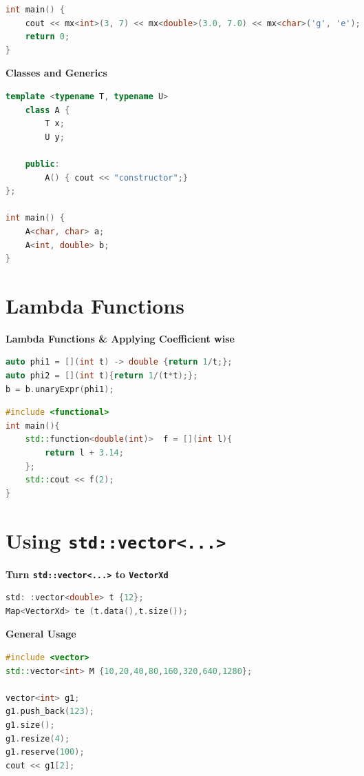 \documentclass{sciposter}
\newcommand{\psection}[1]{\par \textbf{\large#1}}
\begin{document}
\begin{multicols}{2}
\begin{lstlisting}[language=c++]
int main() { 
	cout << mx<int>(3, 7) << mx<double>(3.0, 7.0) << mx<char>('g', 'e'); 
	return 0; 
} 

\end{lstlisting}

\psection{Classes and Generics}
\begin{lstlisting}[language=c++]
template <typename T, typename U> 
	class A { 
		T x; 
		U y; 
	
	public: 
		A() { cout << "constructor";} 
}; 

int main() { 
	A<char, char> a; 
	A<int, double> b; 
} 

\end{lstlisting}




\section*{Lambda Functions}
\psection{Lambda Functions \& Applying Coefficient wise}
\begin{lstlisting}[language=C++]
auto phi1 = [](int t) -> double {return 1/t;};
auto phi2 = [](int t){return 1/(t*t);};
b = b.unaryExpr(phi1);
\end{lstlisting}


\begin{lstlisting}[language=c++]
#include <functional>
int main(){
	std::function<double(int)>  f = [](int l){
		return l + 3.14;
	};
	std::cout << f(2);
}
\end{lstlisting}





\section*{Using \texttt{std::vector<...>}}


\psection{Turn \texttt{std::vector<...>} to \texttt{VectorXd}}

\begin{lstlisting}[language=c++]
std: :vector<double> t {12};
Map<VectorXd> te (t.data(),t.size());
\end{lstlisting}

\psection{General Usage}

\begin{lstlisting}[language=c++]
#include <vector>
std::vector<int> M {10,20,40,80,160,320,640,1280};

vector<int> g1; 
g1.push_back(123); 
g1.size(); 
g1.resize(4); 
g1.reserve(100);
cout << g1[2];
\end{lstlisting}




\end{multicols}
\end{document}
